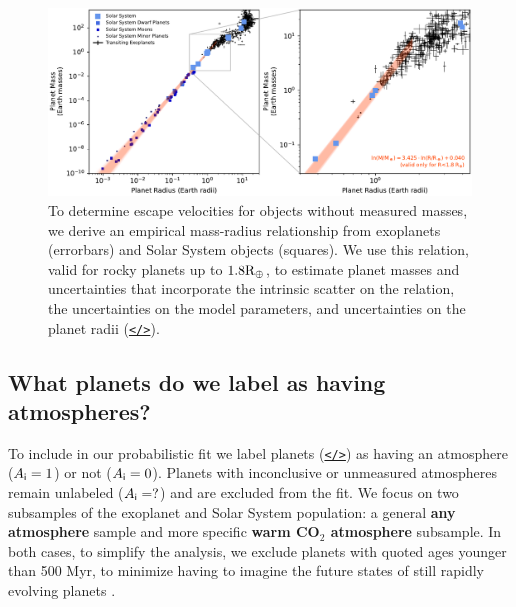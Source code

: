 \documentclass[modern,linenumbers,trackchanges]{aastex7}
\begin{document}
\begin{figure}[ht!]
\includegraphics[width=\textwidth]{figures/mass-radius-relation-for-rocky-planets}
\caption{To determine escape velocities for objects without measured masses, we derive an empirical mass-radius relationship from exoplanets (errorbars) and Solar System objects (squares). We use this relation, valid for rocky planets up to $1.8\rm{R}_\oplus$, to estimate planet masses and uncertainties that incorporate the intrinsic scatter on the relation, the uncertainties on the model parameters, and uncertainties on the planet radii (\href{https://github.com/zkbt/shoreline/blob/main/notebooks/fit-mass-radius-relation.ipynb}{\texttt{</>}}).
}
\label{f:mass-radius}
\end{figure}

\subsection{What planets do we label as having atmospheres?}

To include in our probabilistic fit we label planets (\href{https://github.com/zkbt/shoreline/blob/main/notebooks/curate-and-label-planets.ipynb}{\texttt{</>}}) as having an atmosphere ($A_{\sf i} = 1$) or not ($A_{\sf i} = 0$). Planets with inconclusive or unmeasured atmospheres remain unlabeled ($A_{\sf i} = ?$) and are excluded from the fit. We focus on two subsamples of the exoplanet and Solar System population: a general \textbf{any atmosphere} sample and more specific \textbf{warm CO$_{2}$ atmosphere} subsample. In both cases, to simplify the analysis, we exclude planets with quoted ages younger than 500 Myr, to minimize having to imagine the future states of still rapidly evolving planets \citep{lopezUnderstandingMassRadiusRelation2014a, chenEvolutionaryAnalysisGaseous2016b,  thaoFeatherweightGiantUnraveling2024b}. 
\end{document}
